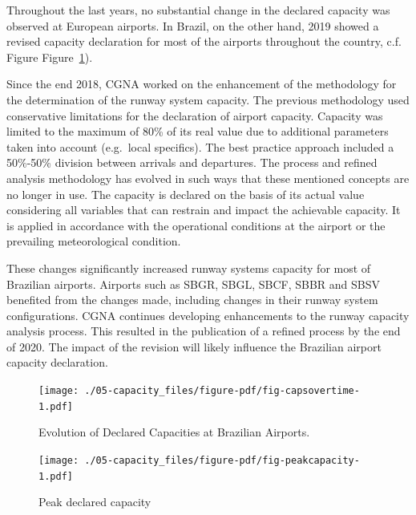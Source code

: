 \documentclass[
  a4paper,
  DIV=11,
  numbers=noendperiod]{scrreprt}
\begin{document}
Throughout the last years, no substantial change in the declared
capacity was observed at European airports. In Brazil, on the other
hand, 2019 showed a revised capacity declaration for most of the
airports throughout the country, c.f. Figure
Figure~\ref{fig-capsovertime}).

Since the end 2018, CGNA worked on the enhancement of the methodology
for the determination of the runway system capacity. The previous
methodology used conservative limitations for the declaration of airport
capacity. Capacity was limited to the maximum of 80\% of its real value
due to additional parameters taken into account (e.g.~local specifics).
The best practice approach included a 50\%-50\% division between
arrivals and departures. The process and refined analysis methodology
has evolved in such ways that these mentioned concepts are no longer in
use. The capacity is declared on the basis of its actual value
considering all variables that can restrain and impact the achievable
capacity. It is applied in accordance with the operational conditions at
the airport or the prevailing meteorological condition.

These changes significantly increased runway systems capacity for most
of Brazilian airports. Airports such as SBGR, SBGL, SBCF, SBBR and SBSV
benefited from the changes made, including changes in their runway
system configurations. CGNA continues developing enhancements to the
runway capacity analysis process. This resulted in the publication of a
refined process by the end of 2020. The impact of the revision will
likely influence the Brazilian airport capacity declaration.

\begin{figure}[h]

{\centering \texttt{[image: ./05-capacity\_files/figure-pdf/fig-capsovertime-1.pdf]}

}

\caption{\label{fig-capsovertime}Evolution of Declared Capacities at
Brazilian Airports.}

\end{figure}

\begin{figure}[h]

{\centering \texttt{[image: ./05-capacity\_files/figure-pdf/fig-peakcapacity-1.pdf]}

}

\caption{\label{fig-peakcapacity}Peak declared capacity}

\end{figure}
\end{document}

